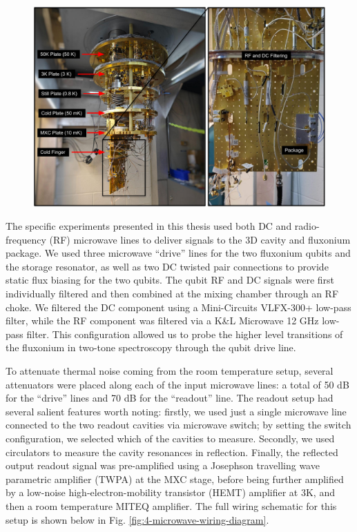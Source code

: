 \begin{figure}[h]
    \centering
    \includegraphics[width=0.9\linewidth]{Figures/4/Fridge-Wiring.pdf}
    \caption{}
    \label{fig:4-fridge-wiring}
\end{figure}

The specific experiments presented in this thesis used both DC and radio-frequency (RF) microwave lines to deliver signals to the 3D cavity and fluxonium package. We used three microwave ``drive'' lines for the two fluxonium qubits and the storage resonator, as well as two DC twisted pair connections to provide static flux biasing for the two qubits. The qubit RF and DC signals were first individually filtered and then combined at the mixing chamber through an RF choke. We filtered the DC component using a Mini-Circuits VLFX-300+ low-pass filter, while the RF component was filtered via a K\&L Microwave 12 GHz low-pass filter. This configuration allowed us to probe the higher level transitions of the fluxonium in two-tone spectroscopy through the qubit drive line. 

To attenuate thermal noise coming from the room temperature setup, several attenuators were placed along each of the input microwave lines: a total of 50 dB for the ``drive'' lines and 70 dB for the ``readout'' line. The readout setup had several salient features worth noting: firstly, we used just a single microwave line connected to the two readout cavities via microwave switch; by setting the switch configuration, we selected which of the cavities to measure. Secondly, we used circulators to measure the cavity resonances in reflection. Finally, the reflected output readout signal was pre-amplified using a Josephson travelling wave parametric amplifier (TWPA) at the MXC stage, before being further amplified by a low-noise high-electron-mobility transistor (HEMT) amplifier at 3K, and then a room temperature MITEQ amplifier. The full wiring schematic for this setup is shown below in Fig. \ref{fig:4-microwave-wiring-diagram}. 


